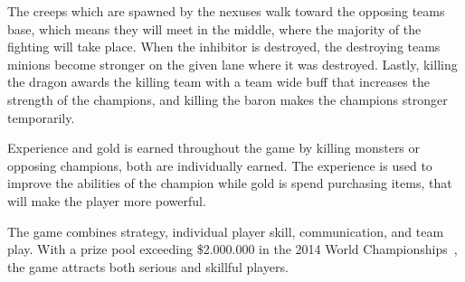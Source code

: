 The creeps which are spawned by the nexuses walk toward the opposing teams base, which means they will meet in the middle, where the majority of the fighting will take place. When the inhibitor is destroyed, the destroying teams minions become stronger on the given lane where it was destroyed. Lastly, killing the dragon awards the killing team with a team wide buff that increases the strength of the champions, and killing the baron makes the champions stronger temporarily.

Experience and gold is earned throughout the game by killing monsters or opposing champions, both are individually earned. The experience is used to improve the abilities of the champion while gold is spend purchasing items, that will make the player more powerful.

The game combines strategy, individual player skill, communication, and team play.
With a prize pool exceeding \$2.000.000 in the 2014 World Championships~\cite{lolprize}, the game attracts both serious and skillful players.

